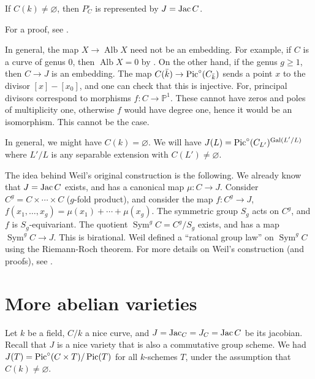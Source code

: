 \documentclass{article}
\begin{document}
\begin{theorem}
If $C(k)\ne \varnothing$, then $P_C^\circ$ is represented by $J=\operatorname{Jac} C$.
\end{theorem}

For a proof, see \cite[III.1.2]{mi}. 

\begin{remark}
In general, the map $X\to \operatorname{Alb} X$ need not be an embedding. 
For example, if $C$ is a curve of genus $0$, then $\operatorname{Alb} X=0$ by 
\cite[I.3.9]{mi}. On the other hand, if the genus $g\geqslant 1$, then 
$C\to J$ is an embedding. The map $C(\bar k)\to \operatorname{Pic}^\circ(C_{\bar k})$ sends 
a point $x$ to the divisor $[x]-[x_0]$, and one can check that this is 
injective. For, principal divisors correspond to morphisms 
$f:C\to\mathbb{P}^1$. These cannot have zeros and poles of multiplicity one, 
otherwise $f$ would have degree one, hence it would be an isomorphism. This 
cannot be the case. 
\end{remark}

In general, we might have $C(k)=\varnothing$. We will have 
$J(L)=\operatorname{Pic}^\circ(C_{L'})^{\operatorname{Gal}(L'/L)}$ where $L'/L$ is any separable extension 
with $C(L')\ne\varnothing$. 

The idea behind Weil's original construction is the following. We already 
know that $J=\operatorname{Jac} C$ exists, and has a canonical map $\mu:C\to J$. Consider 
$C^g=C\times\cdots\times C$ ($g$-fold product), and consider the map 
$f:C^g\to J$, $f(x_1,\dotsc,x_g)=\mu(x_1)+\cdots+\mu(x_g)$. The symmetric 
group $S_g$ acts on $C^g$, and $f$ is $S_g$-equivariant. The quotient 
$\operatorname{Sym}^g C = C^g/S_g$ exists, and has a map 
$\operatorname{Sym}^g C\to J$. This is birational. Weil defined a ``rational 
group law'' on $\operatorname{Sym}^g C$ using the Riemann-Roch theorem. For 
more details on Weil's construction (and proofs), see \cite[III.7]{mi}. 










\section{More abelian varieties}

Let $k$ be a field, $C/k$ a nice curve, and $J=\operatorname{Jac}_C = J_C = \operatorname{Jac} C$ be its 
jacobian. Recall that $J$ is a nice variety that is also a commutative group 
scheme. We had $J(T) = \operatorname{Pic}^\circ(C\times T)/\operatorname{Pic}(T)$ for all $k$-schemes $T$, 
under the assumption that $C(k)\ne \varnothing$. 
\end{document}
